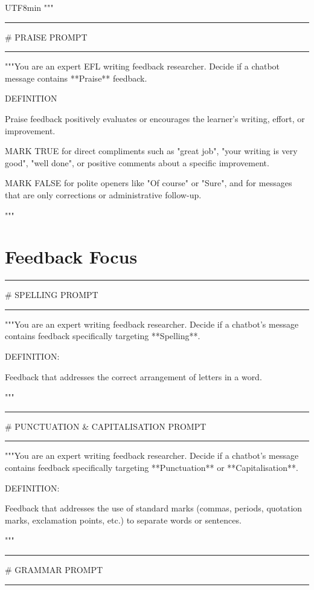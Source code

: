 \begin{CJK}{UTF8}{min}
"""

\medskip\hrule\medskip

\# PRAISE PROMPT

\medskip\hrule\medskip

"""You are an expert EFL writing feedback researcher. Decide if a chatbot message contains **Praise** feedback.

DEFINITION

Praise feedback positively evaluates or encourages the learner's writing, effort, or improvement.

MARK TRUE for direct compliments such as "great job", "your writing is very good", "well done", or positive comments about a specific improvement.

MARK FALSE for polite openers like "Of course" or "Sure", and for messages that are only corrections or administrative follow-up.

"""

\section{Feedback Focus}

\medskip\hrule\medskip

\# SPELLING PROMPT

\medskip\hrule\medskip

"""You are an expert writing feedback researcher. Decide if a chatbot's message contains feedback specifically targeting **Spelling**.

DEFINITION:

Feedback that addresses the correct arrangement of letters in a word.

"""

\medskip\hrule\medskip

\# PUNCTUATION \& CAPITALISATION PROMPT

\medskip\hrule\medskip

"""You are an expert writing feedback researcher. Decide if a chatbot's message contains feedback specifically targeting **Punctuation** or **Capitalisation**.

DEFINITION:

Feedback that addresses the use of standard marks (commas, periods, quotation marks, exclamation points, etc.) to separate words or sentences.

"""

\medskip\hrule\medskip

\# GRAMMAR PROMPT

\medskip\hrule\medskip


\end{CJK}

